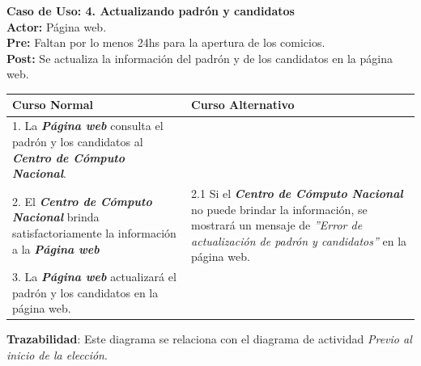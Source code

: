 \documentclass[spanish, 10pt,a4paper]{article}
\numberwithin{equation}{section} %
\begin{document}
\noindent\textbf{Caso de Uso: 4. Actualizando padrón y candidatos}\\
\textbf{Actor: } Página web.\\
\textbf{Pre: } Faltan por lo menos 24hs para la apertura de los comicios.\\
\textbf{Post: } Se actualiza la información del padrón y de los candidatos en la página web.\\
\begin{table}[H]
  \centering
  \begin{tabular}{p{9cm} | p{7cm}}
    \hline
    Curso Normal & Curso Alternativo \\
    \hline
    \hline    
    1. La \textbf{\textit{Página web}} consulta el padrón y los candidatos al \textbf{\textit{Centro de Cómputo Nacional}}. 
    & \\
    
    \hline
    2. El \textbf{\textit{Centro de Cómputo Nacional}} brinda satisfactoriamente la información a la \textbf{\textit{Página web}}
    & 
    2.1 Si el \textbf{\textit{Centro de Cómputo Nacional}} no puede brindar la información, se mostrará un mensaje de \textit{''Error de actualización de padrón y candidatos''} en la página web.
    \\
    
    \hline
    3. La \textbf{\textit{Página web}} actualizará el padrón y los candidatos en la página web.
    & \\
    \hline
  \end{tabular}
\end{table}
\vspace{-10px}
\noindent\textbf{Trazabilidad}: Este diagrama se relaciona con el diagrama de actividad \textit{Previo al inicio de la elección}.\\
\end{document}
